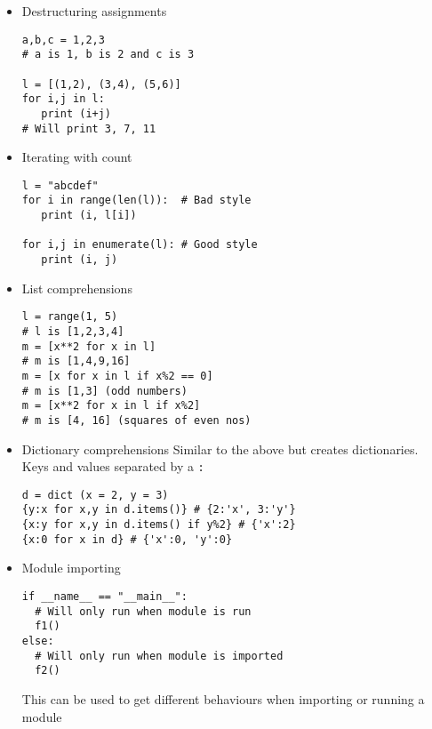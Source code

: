 \begin{itemize}
\item Destructuring assignments
\begin{lstlisting}
a,b,c = 1,2,3
# a is 1, b is 2 and c is 3

l = [(1,2), (3,4), (5,6)]
for i,j in l:
   print (i+j)
# Will print 3, 7, 11
\end{lstlisting}
\item Iterating with count
  \begin{lstlisting}
l = "abcdef"
for i in range(len(l)):  # Bad style
   print (i, l[i])

for i,j in enumerate(l): # Good style
   print (i, j)
  \end{lstlisting}
\item List comprehensions
  \begin{lstlisting}
l = range(1, 5)
# l is [1,2,3,4]
m = [x**2 for x in l] 
# m is [1,4,9,16]
m = [x for x in l if x%2 == 0] 
# m is [1,3] (odd numbers)
m = [x**2 for x in l if x%2]
# m is [4, 16] (squares of even nos)
  \end{lstlisting}
\item Dictionary comprehensions
Similar to the above but creates dictionaries. Keys and values
separated by a \texttt{:}
  \begin{lstlisting}
d = dict (x = 2, y = 3)
{y:x for x,y in d.items()} # {2:'x', 3:'y'}
{x:y for x,y in d.items() if y%2} # {'x':2}
{x:0 for x in d} # {'x':0, 'y':0}
  \end{lstlisting}
\item Module importing
\begin{lstlisting}
if __name__ == "__main__":
  # Will only run when module is run
  f1()
else:
  # Will only run when module is imported
  f2()  
\end{lstlisting}

This can be used to get different behaviours when importing or running
a module
\end{itemize}
